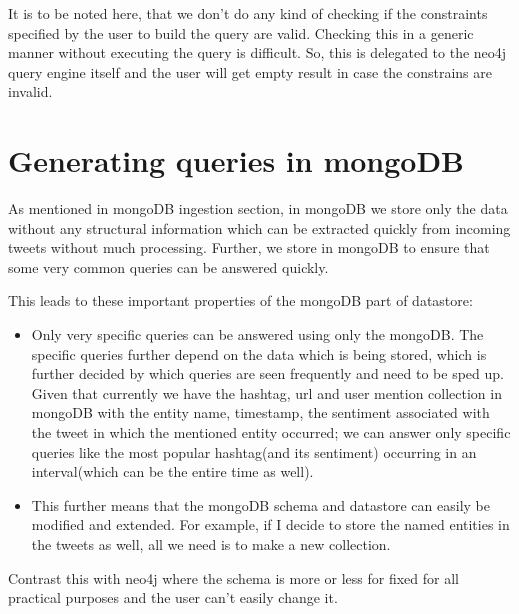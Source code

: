 \documentclass[letterpaper,10pt,english]{sphinxmanual}
\begin{document}
It is to be noted here, that we don’t do any kind of checking if the constraints specified by the user to build the query are valid. Checking this in a generic manner without executing the query is difficult. So, this is delegated to the neo4j query engine itself and the user will get empty result in case the constrains are invalid.


\chapter{Generating queries in mongoDB}
\label{\detokenize{mongoDB_query_generation:generating-queries-in-mongodb}}\label{\detokenize{mongoDB_query_generation::doc}}
As mentioned in mongoDB ingestion section, in mongoDB we store only the data without any structural information which can be extracted quickly from incoming tweets without much processing. Further, we store in mongoDB to ensure that some very common queries can be answered quickly.

This leads to these important properties of the mongoDB part of datastore:
\begin{itemize}
\item {} 
Only very specific queries can be answered using only the mongoDB. The specific queries further depend on the data which is being stored, which is further decided by which queries are seen frequently and need to be sped up. Given that currently we have the hashtag, url and user mention collection in mongoDB with the entity name, timestamp, the sentiment associated with the tweet in which the mentioned entity occurred; we can answer only specific queries like the most popular hashtag(and its sentiment) occurring in an interval(which can be the entire time as well).

\item {} 
This further means that the mongoDB schema and datastore can easily be modified and extended. For example, if I decide to store the named entities in the tweets as well, all we need is to make a new collection.

\end{itemize}

Contrast this with neo4j where the schema is more or less for fixed for all practical purposes and the user can’t easily change it.
\end{document}
